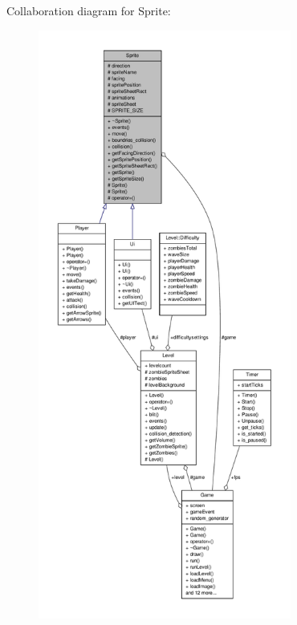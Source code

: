 Collaboration diagram for Sprite\-:
\nopagebreak
\begin{figure}[H]
\begin{center}
\leavevmode
\includegraphics[height=550pt]{classSprite__coll__graph}
\end{center}
\end{figure}
